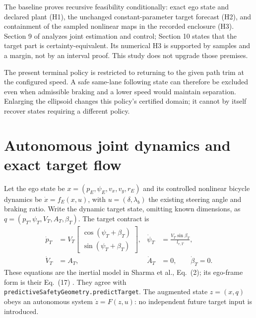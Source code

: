 \documentclass[11pt]{article}
\begin{document}
The baseline proves recursive feasibility conditionally: exact ego state
and declared plant (H1), the unchanged constant-parameter target forecast
(H2), and containment of the sampled nonlinear maps in the recorded
enclosure (H3). Section 9 of  analyzes
joint estimation and control; Section 10 states that the target part is
certainty-equivalent. Its numerical H3 is supported by samples and a margin,
not by an interval proof. This study does not upgrade those premises.

The present terminal policy is restricted to returning to the given path
trim at the configured speed. A safe same-lane following state can therefore
be excluded even when admissible braking and a lower speed would maintain
separation. Enlarging the ellipsoid changes this policy's certified domain;
it cannot by itself recover states requiring a different policy.

\section{Autonomous joint dynamics and exact target flow}
Let the ego state be $x=(p_E,\psi_E,v_x,v_y,r_E)$ and its controlled
nonlinear bicycle dynamics be $\dot x=f_E(x,u)$, with
$u=(\delta,\lambda_b)$ the existing steering angle and braking ratio.
Write the dynamic target state, omitting known dimensions, as
$q=(p_T,\psi_T,V_T,A_T,\beta_T)$. The target contract is
\begin{align}
\dot p_T&=V_T\begin{bmatrix}\cos(\psi_T+\beta_T)\\
                                  \sin(\psi_T+\beta_T)\end{bmatrix}, &
\dot\psi_T&=\frac{V_T\sin\beta_T}{l_{r,T}},\label{eq:target}\\
\dot V_T&=A_T, & \dot A_T&=0,\qquad\dot\beta_T=0.\nonumber
\end{align}
These equations are the inertial model in Sharma et al., Eq.~(2); its
ego-frame form is their Eq.~(17) \cite{sharma}. They agree with
\texttt{predictiveSafetyGeometry.predictTarget}.
The augmented state $z=(x,q)$ obeys an autonomous system
$\dot z=F(z,u)$: no independent future target input is introduced.
\end{document}
